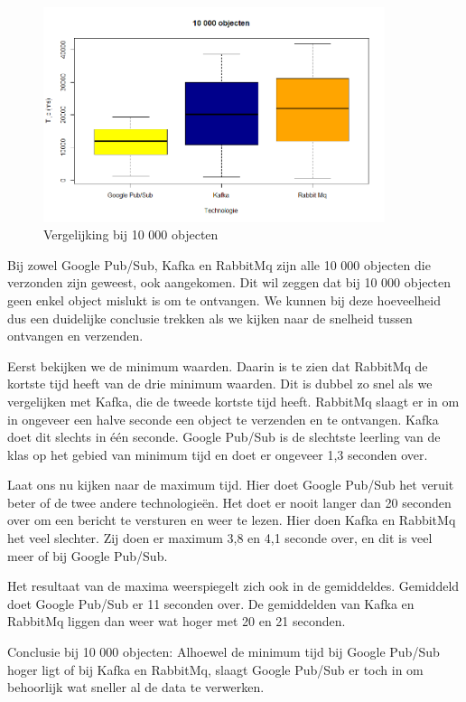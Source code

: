  \begin{figure}[h!]
    \centering
    \includegraphics[width=100mm]{../10000Boxplot.png}
    \caption{Vergelijking bij 10 000 objecten}
    
\end{figure}

Bij zowel Google Pub/Sub, Kafka en RabbitMq zijn alle 10 000 objecten die verzonden zijn geweest, ook aangekomen. Dit wil zeggen dat bij 10 000 objecten geen enkel object mislukt is om te ontvangen. We kunnen bij deze hoeveelheid dus een duidelijke conclusie trekken als we kijken naar de snelheid tussen ontvangen en verzenden. 

Eerst bekijken we de minimum waarden. Daarin is te zien dat RabbitMq de kortste tijd heeft van de drie minimum waarden. Dit is dubbel zo snel als we vergelijken met Kafka, die de tweede kortste tijd heeft. RabbitMq slaagt er in om in ongeveer een halve seconde een object te verzenden en te ontvangen. Kafka doet dit slechts in één seconde. Google Pub/Sub is de slechtste leerling van de klas op het gebied van minimum tijd en doet er ongeveer 1,3 seconden over.

Laat ons nu kijken naar de maximum tijd. Hier doet Google Pub/Sub het veruit beter of de twee andere technologieën. Het doet er nooit langer dan 20 seconden over om een bericht te versturen en weer te lezen. Hier doen Kafka en RabbitMq het veel slechter. Zij doen er maximum 3,8 en 4,1 seconde over, en dit is veel meer of bij Google Pub/Sub.

Het resultaat van de maxima weerspiegelt zich ook in de gemiddeldes. Gemiddeld doet Google Pub/Sub er 11 seconden over. De gemiddelden van Kafka en RabbitMq liggen dan weer wat hoger met 20 en 21 seconden.

Conclusie bij 10 000 objecten: Alhoewel de minimum tijd bij Google Pub/Sub hoger ligt of bij Kafka en RabbitMq, slaagt Google Pub/Sub er toch in om behoorlijk wat sneller al de data te verwerken. 


